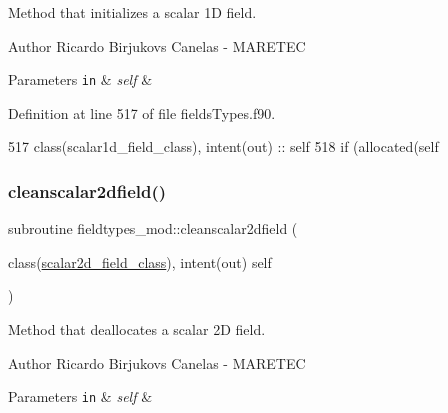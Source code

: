 Method that initializes a scalar 1D field. 

\begin{DoxyAuthor}{Author}
Ricardo Birjukovs Canelas -\/ M\+A\+R\+E\+T\+EC 
\end{DoxyAuthor}

\begin{DoxyParams}[1]{Parameters}
\mbox{\tt in}  & {\em self} & \\
\hline
\end{DoxyParams}


Definition at line 517 of file fields\+Types.\+f90.


\begin{DoxyCode}
517     \textcolor{keywordtype}{class}(scalar1d\_field\_class), \textcolor{keywordtype}{intent(out)} :: self
518     \textcolor{keywordflow}{if} (\textcolor{keyword}{allocated}(self%
\end{DoxyCode}
\mbox{\label{namespacefieldtypes__mod_a26a4170db6067cf4ba85099f9701ff4c}} 
\subsubsection{\texorpdfstring{cleanscalar2dfield()}{cleanscalar2dfield()}}
{\footnotesize\ttfamily subroutine fieldtypes\+\_\+mod\+::cleanscalar2dfield (\begin{DoxyParamCaption}\item[{class(\mbox{\hyperlink{structfieldtypes__mod_1_1scalar2d__field__class}{scalar2d\+\_\+field\+\_\+class}}), intent(out)}]{self }\end{DoxyParamCaption})\hspace{0.3cm}{\ttfamily [private]}}



Method that deallocates a scalar 2D field. 

\begin{DoxyAuthor}{Author}
Ricardo Birjukovs Canelas -\/ M\+A\+R\+E\+T\+EC 
\end{DoxyAuthor}

\begin{DoxyParams}[1]{Parameters}
\mbox{\tt in}  & {\em self} & \\
\hline
\end{DoxyParams}


